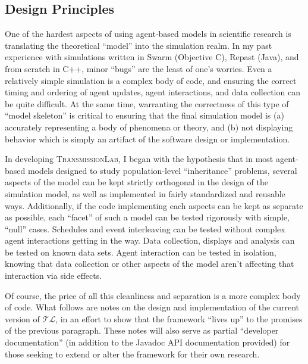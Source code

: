 \documentclass[noid]{kluwer-mem-proposal}
\newcommand{\tlfull}{\textsc{TransmissionLab}\xspace}
\newcommand{\tlshort}{\ensuremath{\mathcal{TL}}\xspace}
\begin{document}
\begin{article}
\section{Design Principles}
One of the hardest aspects of using agent-based models in scientific research is
translating the theoretical ``model'' into the simulation realm.  In my past experience with simulations
written in Swarm (Objective C), Repast (Java), and from scratch in C++, minor
``bugs'' are the least of one's worries.  Even a relatively simple simulation is a complex body
of code, and ensuring the correct timing and ordering of agent updates,
agent interactions, and data collection can be quite difficult.  At the same time, warranting the correctness of
this type of ``model skeleton'' is critical to ensuring that the final simulation model is (a) accurately representing a body of phenomena or theory, and (b) not displaying behavior which is simply an artifact of the software design or implementation.

In developing \tlfull, I began with the hypothesis that 
in most agent-based models designed to study
population-level ``inheritance'' problems, several aspects of the model can be
kept strictly orthogonal in the design of the simulation model, as well as implemented in fairly standardized
and reusable ways.  Additionally, if the code implementing each aspects
can be kept as separate as possible, each ``facet'' of such a model can be
tested rigorously with simple, ``null'' cases.  Schedules and event interleaving
can be tested without complex agent interactions getting in the way.  Data collection,
displays and analysis can be tested on known data sets.  Agent interaction can
be tested in isolation, knowing that data collection or other aspects of the
model aren't affecting that interaction via side effects.  

Of course, the price of all this cleanliness and separation is a more complex
body of code.  What follows are notes on the design and implementation of the current version of \tlshort, in an 
effort to show that the framework ``lives up'' to the promises of the previous paragraph.  These notes will
also serve as partial ``developer documentation'' (in addition to the Javadoc API documentation provided) for those
seeking to extend or alter the framework for their own research.


\end{article}
\end{document}
